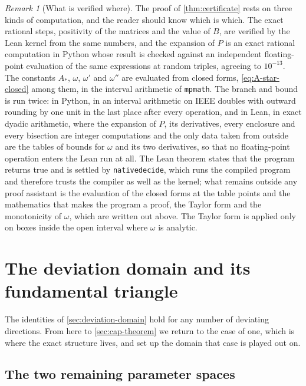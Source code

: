 \documentclass[11pt,reqno]{amsart}
\renewcommand{\_}{\origunderscore\allowbreak}
\numberwithin{equation}{section}
\theoremstyle{plain}
\theoremstyle{definition}
\theoremstyle{remark}
\newtheorem{remark}[thm]{Remark}
\begin{document}
\begin{remark}[What is verified where]\label{rem:certificate-trust}
The proof of \cref{thm:certificate} rests on three kinds of
computation, and the reader should know which is which. The exact
rational steps, positivity of the matrices and the value of $B$, are
verified by the Lean kernel from the same numbers, and the expansion of
$P$ is an exact rational computation in Python whose result is checked
against an independent floating-point evaluation of the same
expressions at random triples, agreeing to $10^{-13}$. The constants
$A_*$, $\omega$, $\omega'$ and $\omega''$ are evaluated from closed forms,
\eqref{eq:A-star-closed} among them, in the interval arithmetic of
\texttt{mpmath}. The branch and bound is run twice: in Python, in an
interval arithmetic on IEEE doubles with outward rounding by one unit
in the last place after every operation, and in Lean, in exact dyadic
arithmetic, where the expansion of $P$, its derivatives, every
enclosure and every bisection are integer computations and the only
data taken from outside are the tables of bounds for $\omega$ and its
two derivatives, so that no floating-point operation enters the Lean
run at all. The Lean theorem states that the program returns true and
is settled by \texttt{native\_decide}, which runs the compiled program
and therefore trusts the compiler as well as the kernel; what remains
outside any proof assistant is the evaluation of the closed forms at
the table points and the mathematics that makes the program a proof,
the Taylor form and the monotonicity of $\omega$, which are written
out above. The Taylor form is applied only on boxes inside the open
interval where $\omega$ is analytic.
\end{remark}
\section{The deviation domain and its fundamental triangle}\label{sec:deviation-triangle}

The identities of \cref{sec:deviation-domain} hold for any number of
deviating directions. From here to \cref{sec:cap-theorem} we return to
the case of one, which is where the exact structure lives, and set up the
domain that case is played out on.

\subsection{The two remaining parameter spaces}\label{sec:two-remaining}
\end{document}
